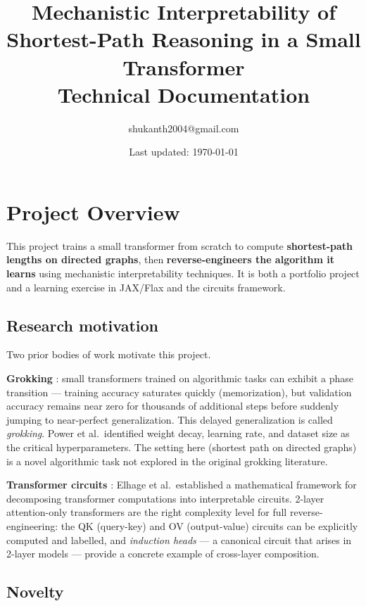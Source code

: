 \documentclass[11pt, a4paper]{article}
\title{%
  \textbf{Mechanistic Interpretability of\\Shortest-Path Reasoning in a Small Transformer}\\[0.5em]
  \large Technical Documentation
}
\author{shukanth2004@gmail.com}
\date{Last updated: \today}
\begin{document}
\maketitle
\tableofcontents
\newpage

\section{Project Overview}

This project trains a small transformer from scratch to compute
\textbf{shortest-path lengths on directed graphs}, then
\textbf{reverse-engineers the algorithm it learns} using mechanistic
interpretability techniques. It is both a portfolio project and a learning
exercise in JAX/Flax and the circuits framework.

\subsection{Research motivation}

Two prior bodies of work motivate this project.

\textbf{Grokking} \cite{power2022grokking}: small transformers trained on
algorithmic tasks can exhibit a phase transition — training accuracy saturates
quickly (memorization), but validation accuracy remains near zero for thousands
of additional steps before suddenly jumping to near-perfect generalization. This
delayed generalization is called \emph{grokking}. Power et al.\ identified
weight decay, learning rate, and dataset size as the critical hyperparameters.
The setting here (shortest path on directed graphs) is a novel algorithmic task
not explored in the original grokking literature.

\textbf{Transformer circuits} \cite{elhage2021mathematical}: Elhage et al.\
established a mathematical framework for decomposing transformer computations
into interpretable circuits. 2-layer attention-only transformers are the right
complexity level for full reverse-engineering: the QK (query-key) and OV
(output-value) circuits can be explicitly computed and labelled, and
\emph{induction heads} --- a canonical circuit that arises in 2-layer models
--- provide a concrete example of cross-layer composition.

\subsection{Novelty}
\end{document}
